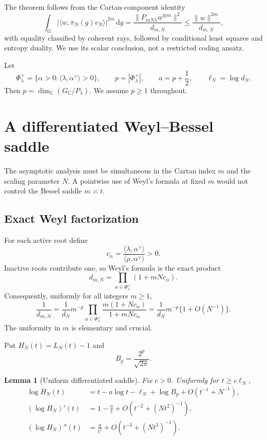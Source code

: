 \documentclass[11pt]{article}
\newtheorem{lemma}[theorem]{Lemma}
\newcommand{\C}{\mathbb C}
\newcommand{\dd}{\mathrm d}
\newcommand{\ip}[2]{\langle #1,#2\rangle}
\begin{document}
The theorem follows from the Cartan-component identity
\[
 \int_G|\ip{w}{\pi_N(g)v_N}|^{2m}\,\dd g
 =\frac{\|P_{mN\lambda}w^{\otimes m}\|^2}{d_{m,N}}
 \le\frac{\|w\|^{2m}}{d_{m,N}},
\]
with equality classified by coherent rays, followed by conditional least
squares and entropy duality.  We use its scalar conclusion, not a restricted
coding ansatz.

Let
\[
 \Phi^+_\lambda=\{\alpha>0:
 \langle\lambda,\alpha^\vee\rangle>0\},
 \qquad p=|\Phi^+_\lambda|,
 \qquad a=p+\frac12,
 \qquad \ell_N=\log d_N.                                 \label{eq:pa}
\]
Then $p=\dim_{\C}(G_{\C}/P_\lambda)$.  We assume $p\ge1$ throughout.

\section{A differentiated Weyl--Bessel saddle}

The asymptotic analysis must be simultaneous in the Cartan index $m$ and
the scaling parameter $N$.  A pointwise use of Weyl's formula at fixed $m$
would not control the Bessel saddle $m\asymp t$.

\subsection{Exact Weyl factorization}

For each active root define
\[
 c_\alpha=
 \frac{\langle\lambda,\alpha^\vee\rangle}
      {\langle\rho,\alpha^\vee\rangle}>0.
\]
Inactive roots contribute one, so Weyl's formula is the exact product
\[
 d_{m,N}=\prod_{\alpha\in\Phi^+_\lambda}(1+mNc_\alpha).
                                                               \label{eq:weyl}
\]
Consequently, uniformly for all integers $m\ge1$,
\[
 \frac1{d_{m,N}}
 =\frac1{d_N}m^{-p}
 \prod_{\alpha\in\Phi^+_\lambda}
 \frac{m(1+Nc_\alpha)}{1+mNc_\alpha}
 =\frac1{d_N}m^{-p}\{1+O(N^{-1})\}.                     \label{eq:uniformweyl}
\]
The uniformity in $m$ is elementary and crucial.

Put $H_N(t)=L_N(t)-1$ and
\[
 B_p=\frac{2^p}{\sqrt{2\pi}}.
\]

\begin{lemma}[Uniform differentiated saddle]
\label{lem:saddle}
Fix $c>0$.  Uniformly for $t\ge c\ell_N$,
\begin{align}
 \log H_N(t)
 &=t-a\log t-\ell_N+\log B_p
   +O(t^{-1}+N^{-1}),                                    \label{eq:logH}\\
 (\log H_N)'(t)
 &=1-\frac at+O(t^{-2}+(Nt^2)^{-1}),                    \label{eq:dlogH}\\
 (\log H_N)''(t)
 &=\frac a{t^2}+O(t^{-3}+(Nt^3)^{-1}).                  \label{eq:ddlogH}
\end{align}
\end{lemma}
\end{document}
